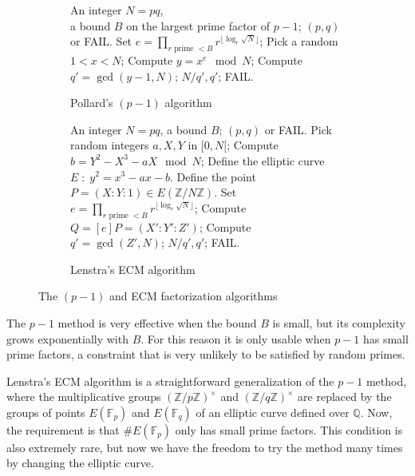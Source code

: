 \documentclass[10pt]{article}
\theoremstyle{plain}
\theoremstyle{definition}
\def\F{\ensuremath{\mathbb{F}}}
\begin{document}
\begin{prposition}
\begin{figure}
  \begin{subfigure}{0.45\textwidth}
    \begin{algorithmic}[1]
      \REQUIRE An integer $N=pq$,\\
      a bound $B$ on the largest prime factor of $p-1$;
      \ENSURE $(p,q)$ or FAIL.
      \STATE Set $e = \prod_{r \text{ prime } < B} r^{\lfloor\log_r\sqrt{N}\rfloor}$;
      \STATE Pick a random $1 < x < N$;
      \STATE Compute $y = x^e \mod N$;
      \STATE Compute $q' = \gcd(y-1, N)$;
      \RETURN $N/q', q'$;
      \ELSE
      \RETURN FAIL.
      \ENDIF
    \end{algorithmic}
    
    \caption{Pollard's $(p-1)$ algorithm}
    \label{fig:p-1}
  \end{subfigure}
  \hfill
  \begin{subfigure}{0.45\textwidth}
    \begin{algorithmic}[1]
      \REQUIRE An integer $N=pq$, a bound $B$;
      \ENSURE $(p,q)$ or FAIL.
      \STATE Pick random integers $a,X,Y$ in $[0,N[$;
      \STATE Compute $b = Y^2 - X^3 - aX \mod N$;
      \STATE Define the elliptic curve $E \;:\; y^2 = x^3 - ax - b$.
      \STATE Define the point $P=(X:Y:1) ∈ E(ℤ/Nℤ)$.
      \STATE Set $e = \prod_{r \text{ prime } < B} r^{\lfloor\log_r\sqrt{N}\rfloor}$;
      \STATE Compute $Q = [e]P = (X':Y':Z')$;
      \STATE Compute $q' = \gcd(Z', N)$;
      \RETURN $N/q', q'$;
      \ELSE
      \RETURN FAIL.
      \ENDIF
    \end{algorithmic}
    
    \caption{Lenstra's ECM algorithm}
    \label{fig:ecm}
  \end{subfigure}
  \caption{The $(p-1)$ and ECM factorization algorithms}
\end{figure}

The $p-1$ method is very effective when the bound $B$ is small, but
its complexity grows exponentially with $B$. %
For this reason it is only usable when $p-1$ has small prime factors,
a constraint that is very unlikely to be satisfied by random primes.

Lenstra's ECM algorithm is a straightforward generalization of the
$p-1$ method, where the multiplicative groups $(ℤ/pℤ)^{×}$ and
$(ℤ/qℤ)^{×}$ are replaced by the groups of points $E(\F_p)$ and
$E(\F_q)$ of an elliptic curve defined over $ℚ$. %
Now, the requirement is that $\#E(\F_p)$ only has small prime
factors. %
This condition is also extremely rare, but now we have the freedom to
try the method many times by changing the elliptic curve. %


\end{prposition}
\end{document}
